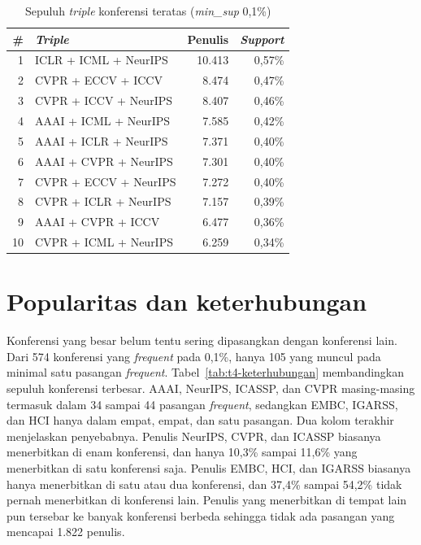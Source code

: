 \begin{table}[ht]
\caption{Sepuluh \textit{triple} konferensi teratas (\textit{min\_sup} 0,1\%)}
\label{tab:t4-triple}
\small
\begin{tabular}{@{}rlrr@{}}
\toprule
\textbf{\#} & \textbf{\textit{Triple}} & \textbf{Penulis} & \textbf{\textit{Support}} \\
\midrule
1 & ICLR + ICML + NeurIPS & 10.413 & 0,57\% \\
2 & CVPR + ECCV + ICCV & 8.474 & 0,47\% \\
3 & CVPR + ICCV + NeurIPS & 8.407 & 0,46\% \\
4 & AAAI + ICML + NeurIPS & 7.585 & 0,42\% \\
5 & AAAI + ICLR + NeurIPS & 7.371 & 0,40\% \\
6 & AAAI + CVPR + NeurIPS & 7.301 & 0,40\% \\
7 & CVPR + ECCV + NeurIPS & 7.272 & 0,40\% \\
8 & CVPR + ICLR + NeurIPS & 7.157 & 0,39\% \\
9 & AAAI + CVPR + ICCV & 6.477 & 0,36\% \\
10 & CVPR + ICML + NeurIPS & 6.259 & 0,34\% \\
\bottomrule
\end{tabular}
\end{table}

\section{Popularitas dan keterhubungan}
\label{sec:hasil-t4-fp-keterhubungan}
Konferensi yang besar belum tentu sering dipasangkan dengan konferensi lain. Dari 574 konferensi yang \textit{frequent} pada 0,1\%, hanya 105 yang muncul pada minimal satu pasangan \textit{frequent}. Tabel~\ref{tab:t4-keterhubungan} membandingkan sepuluh konferensi terbesar. AAAI, NeurIPS, ICASSP, dan CVPR masing-masing termasuk dalam 34 sampai 44 pasangan \textit{frequent}, sedangkan EMBC, IGARSS, dan HCI hanya dalam empat, empat, dan satu pasangan. Dua kolom terakhir menjelaskan penyebabnya. Penulis NeurIPS, CVPR, dan ICASSP biasanya menerbitkan di enam konferensi, dan hanya 10,3\% sampai 11,6\% yang menerbitkan di satu konferensi saja. Penulis EMBC, HCI, dan IGARSS biasanya hanya menerbitkan di satu atau dua konferensi, dan 37,4\% sampai 54,2\% tidak pernah menerbitkan di konferensi lain. Penulis yang menerbitkan di tempat lain pun tersebar ke banyak konferensi berbeda sehingga tidak ada pasangan yang mencapai 1.822 penulis.


